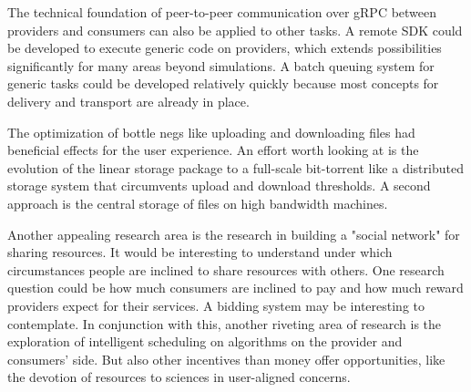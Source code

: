 The technical foundation of peer-to-peer communication over gRPC between providers and consumers can also be applied to other tasks. A remote SDK could be developed to execute generic code on providers, which extends possibilities significantly for many areas beyond simulations. A batch queuing system for generic tasks could be developed relatively quickly because most concepts for delivery and transport are already in place.

The optimization of bottle negs like uploading and downloading files had beneficial effects for the user experience. An effort worth looking at is the evolution of the linear storage package to a full-scale bit-torrent like a distributed storage system that circumvents upload and download thresholds. A second approach is the central storage of files on high bandwidth machines.

Another appealing research area is the research in building a "social network" for sharing resources. It would be interesting to understand under which circumstances people are inclined to share resources with others. One research question could be how much consumers are inclined to pay and how much reward providers expect for their services. A bidding system may be interesting to contemplate. In conjunction with this, another riveting area of research is the exploration of intelligent scheduling on algorithms on the provider and consumers' side. But also other incentives than money offer opportunities, like the devotion of resources to sciences in user-aligned concerns.
